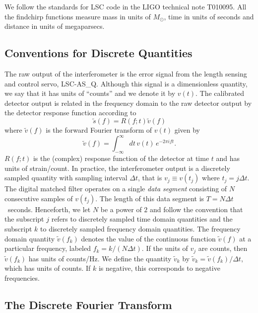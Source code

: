 We follow the standards for LSC code in the LIGO technical note T010095.  All
the findchirp functions measure mass in units of $M_\odot$, time in units
of seconds and distance in units of megaparsecs.

\subsection{Conventions for Discrete Quantities}
\label{ss:conventions}

The raw output of the interferometer is the error signal from the length
sensing and control servo, LSC-AS\_Q.  Although this signal is a dimensionless
quantity, we say that it has units of ``counts'' and we denote it by $v(t)$.
The calibrated detector output is related in the frequency domain to the raw
detector output by the detector response function according to 
\begin{equation}
\tilde{s}(f) = R(f;t) \tilde{v}(f)
\end{equation}
where $\tilde{v}(f)$ is the forward Fourier transform of $v(t)$ given by
\begin{equation}
\tilde{v}(f)=\int_{-\infty}^\infty dt\,v(t)\, e^{- 2 \pi i f t}.
\end{equation}
$R(f;t)$ is the (complex) response function of the detector at time $t$
and has units of strain/count.  In practice, the interferometer output is a
discretely sampled quantity with sampling interval $\Delta t$, that is $v_j
\equiv v(t_j)$ where $t_j = j\Delta t$.  The digital matched filter operates
on a single \emph{data segment} consisting of $N$ consecutive samples of
$v(t_j)$. The length of this data segment is $T = N\Delta t$~seconds.
Henceforth, we let $N$ be a power of $2$ and follow the convention that the
subscript $j$ refers to discretely sampled time domain quantities and the
subscript $k$ to discretely sampled frequency domain quantities.  The
frequency domain quantity $\tilde{v}(f_k)$ denotes the value of the continuous
function $\tilde{v}(f)$ at a particular frequency, labeled $f_k = k/(N\Delta
t)$. If the units of $v_j$ are counts, then $\tilde{v}(f_k)$ has units of
counts/Hz. We define the quantity $\tilde{v}_k$ by $\tilde{v}_k =
\tilde{v}(f_k) / \Delta t$, which has units of counts. If $k$ is negative,
this corresponds to negative frequencies.

\subsection{The Discrete Fourier Transform}
\label{ss:dft}

